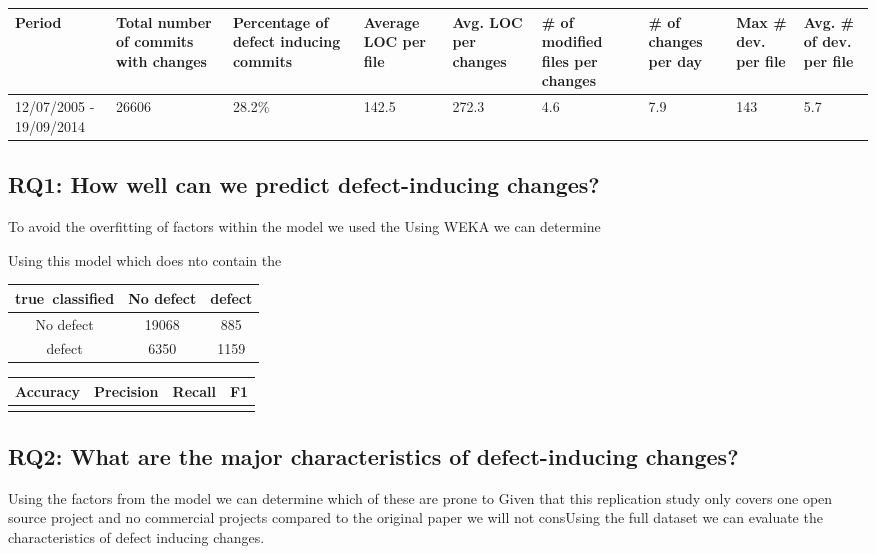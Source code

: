 \documentclass[10pt, conference]{IEEEtran}
\begin{document}
\begin{table}
	\begin{tabular}{|p{2 cm}|p{1.5 cm}|p{1.5 cm}|p{1.5 cm}|p{1.5 cm}|p{1.5 cm}|p{1.5 cm}|p{1.5 cm}|p{1.5 cm}|}
		\hline 
		Period  & Total number of commits with changes  & Percentage of defect inducing commits  & Average LOC per file  & Avg. LOC per changes  & \# of modified files per changes  & \# of changes per day  & Max \# dev. per file  & Avg. \# of dev. per file \tabularnewline
		\hline 
		12/07/2005 - 19/09/2014  & 26606  & 28.2\% & 142.5 & 272.3 & 4.6 & 7.9 & 143 & 5.7 \\ \hline 
	\end{tabular}
	\label{table:statistics}	
\end{table}

\subsection{RQ1: How well can we predict defect-inducing changes?}
\label{sec:rq1}


To avoid the overfitting of factors within the model we used the Using WEKA we can determine 

Using this model which does nto contain the 
\begin{table}
	
	\begin{tabular}{|c|c|c|}
		\hline 
		true\ classified  & No defect  & defect \tabularnewline
		\hline 
		No defect  & 19068  & 885 \tabularnewline
		\hline 
		defect  & 6350  & 1159 \tabularnewline
		\hline 
	\end{tabular}
	\label{table:confusion}
\end{table}

\begin{table}
	\begin{tabular}{|c|c|c|c|}
		\hline Accuracy & Precision & Recall & F1 \\ 
		\hline  &  &  &  \\ 
		\hline 
	\end{tabular}
	
	\label{table:prediction} 
\end{table}


\subsection{RQ2: What are the major characteristics of defect-inducing changes?}
\label{sec:rq2}

Using the factors from the model we can determine which of these are prone to Given that this replication study only covers one open source project and no commercial projects compared to the original paper we will not consUsing the full dataset we can evaluate the characteristics of defect inducing changes. 
\end{document}
